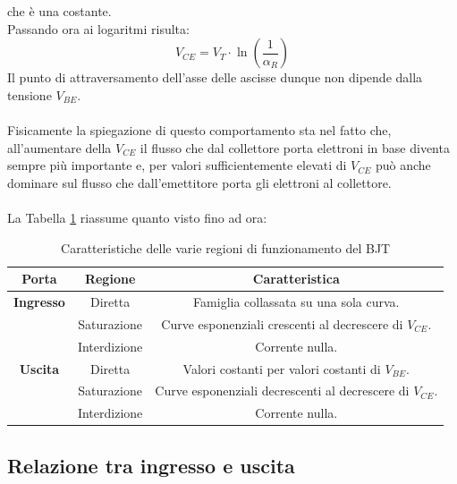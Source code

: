 \documentclass{article}
\numberwithin{equation}{subsection}
\begin{document}
	che è una costante. \\
	Passando ora ai logaritmi risulta:
	$$V _ { C E } = V _ { T } \cdot \ln \left( \frac { 1 } { \alpha _ { R } } \right)$$
	Il punto di attraversamento dell’asse delle ascisse dunque non dipende dalla tensione $V_{BE}$.\\\\
	Fisicamente la spiegazione di questo comportamento sta nel fatto che, all’aumentare della $V_{CE}$ il flusso che dal collettore porta elettroni in base diventa sempre più importante e, per valori sufficientemente elevati di $V_{CE}$ può anche dominare sul flusso che dall’emettitore porta gli elettroni al collettore.\\\\
	La Tabella \ref{tab:table-6} riassume quanto visto fino ad ora:
	\begin{table}[ht]
		\centering
		\begin{tabular}{|c|c|c|}
			\hline
			\textbf{Porta} & \textbf{Regione} & \textbf{Caratteristica} \\
			\hline
			\textbf{Ingresso} & Diretta & Famiglia collassata su una sola curva. \\
			\hline
			& Saturazione & Curve esponenziali crescenti al decrescere di $V_{CE}$. \\
			\hline
			& Interdizione & Corrente nulla. \\
			\hline
			\textbf{Uscita} & Diretta & Valori costanti per valori costanti di $V_{BE}$. \\
			\hline
			& Saturazione & Curve esponenziali decrescenti al decrescere di $V_{CE}$. \\
			\hline
			& Interdizione & Corrente nulla. \\
			\hline
		\end{tabular}
		\caption{Caratteristiche delle varie regioni di funzionamento del BJT}
		\label{tab:table-6}
	\end{table}
	\subsection{Relazione tra ingresso e uscita}
\end{document}
